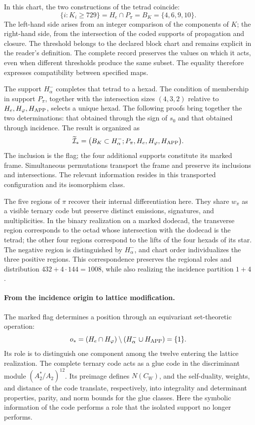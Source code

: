 In this chart, the two constructions of the tetrad coincide:
\begin{equation}
 \{i:K_i\geq729\}
 =H_e\cap P_\pi=B_K=\{4,6,9,10\}.
 \label{inc-ampl-cuaterna}
\end{equation}
The left-hand side arises from an integer comparison of the components
of $K$; the right-hand side, from the intersection of the coded supports of
propagation and closure. The threshold belongs to the declared block
chart and remains explicit in the reader's definition. The
complete record preserves the values on which it acts, even when
different thresholds produce the same subset. The equality therefore
expresses compatibility between specified maps.

The support $H^-_\alpha$ completes that tetrad to a hexad. The
condition of membership in support $P_\pi$, together with the intersection
sizes $(4,3,2)$ relative to $H_e,H_\varphi,H_{\rm APP}$,
selects a unique hexad. The following proofs bring together the two
determinations: that obtained through the sign of $s_0$ and that obtained
through incidence. The result is organized as
\begin{equation}
 \widetilde{\mathcal I}_*
 =\bigl(B_K\subset H^-_\alpha;
         P_\pi,H_e,H_\varphi,H_{\rm APP}\bigr).
 \label{inc-ampl-marco}
\end{equation}
The inclusion is the flag; the four additional supports constitute
its marked frame. Simultaneous permutations transport the frame and
preserve its inclusions and intersections. The relevant information resides
in this transported configuration and its isomorphism class.

The five regions of $\pi$ recover their internal differentiation here.
They share $w_\pi$ as a visible ternary code but preserve distinct emissions,
signatures, and multiplicities. In the binary realization on a
marked dodecad, the transverse region corresponds to the octad whose
intersection with the dodecad is the tetrad; the other four regions
correspond to the lifts of the four hexads of its star. The
negative region is distinguished by $H^-_\alpha$, and chart order
individualizes the three positive regions. This correspondence preserves
the regional roles and distribution $432+4\cdot144=1008$, while
also realizing the incidence partition $1+4$.

\paragraph{From the incidence origin to lattice modification.}
\label{inc-ampl-reticulo}
The marked flag determines a position through an equivariant
set-theoretic operation:
\[
 o_*=(H_e\cap H_\varphi)
       \setminus(H^-_\alpha\cup H_{\rm APP})=\{1\}.
\]
Its role is to distinguish one component among the twelve
entering the lattice realization. The complete ternary code
acts as a glue code in the discriminant module
$(A_2^*/A_2)^{12}$. Its preimage defines $N(C_W)$, and the
self-duality, weights, and distance of the code translate,
respectively, into integrality and determinant properties, parity,
and norm bounds for the glue classes. Here the symbolic information
of the code performs a role that the isolated support no longer performs.

